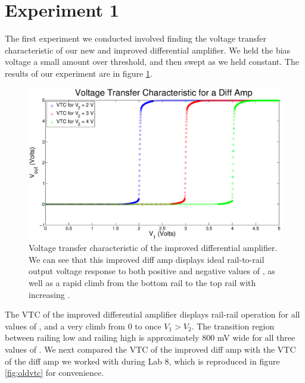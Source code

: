 \section*{Experiment 1}

The first experiment we conducted involved finding the voltage transfer characteristic of our new and improved differential amplifier. We held the bias voltage a small amount over threshold, and then swept \Vone as we held \Vtwo constant. The results of our experiment are in figure \ref{fig:exp1p1}.

\begin{figure}[H]
\centering
\includegraphics[width=\linewidth]{../Figures/Exp1.eps}
\caption{Voltage transfer characteristic of the improved differential amplifier. We can see that this improved diff amp displays ideal rail-to-rail output voltage response to both positive and negative values of \Vdm, as well as a rapid climb from the bottom rail to the top rail with increasing \Vdm.}
\label{fig:exp1p1}
\end{figure}
The VTC of the improved differential amplifier displays rail-rail operation for all values of \Vone, and a very climb from 0 to \Vdd once $V_1 > V_2$. The transition region between railing low and railing high is approximately 800 mV wide for all three values of \Vtwo. We next compared the VTC of the improved diff amp with the VTC of the diff amp we worked with during Lab 8, which is reproduced in figure \ref{fig:oldvtc} for convenience.
